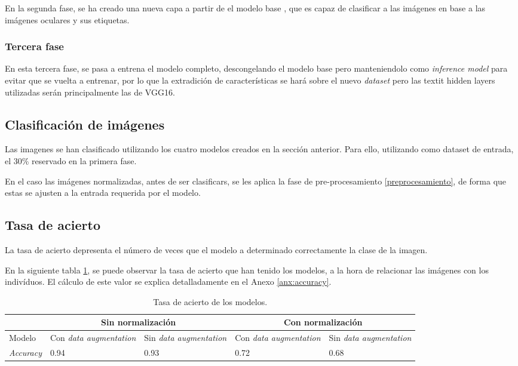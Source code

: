 En la segunda fase, se ha creado una nueva capa a partir de el modelo base , que es capaz de clasificar a las imágenes en base a las imágenes oculares y sus etiquetas. 

\subsubsection{Tercera fase}

En esta tercera fase, se pasa a entrena el modelo completo, descongelando el modelo base pero manteniendolo como \textit{inference model} para evitar que se vuelta a entrenar,  por lo que la extradición de características se hará sobre el nuevo \textit{dataset} pero las textit {hidden layers} utilizadas serán principalmente las de VGG16.

\subsection{Clasificación de imágenes}

Las imagenes se han clasificado utilizando los cuatro modelos creados en la sección anterior. Para ello, utilizando como dataset de entrada, el 30\% reservado en la primera fase.

En el caso las imágenes normalizadas, antes de ser clasificars, se les aplica la fase de pre-procesamiento \ref{preprocesamiento}, de forma que estas se ajusten a la entrada requerida por el modelo.

\subsection{Tasa de acierto} 

La tasa de acierto depresenta el número de veces que el modelo a determinado correctamente la clase de la imagen. 

En la siguiente tabla \ref{tabla:tasa-acierto-modelos}, se puede observar la tasa de acierto que han tenido los modelos, a la hora de relacionar las imágenes
 con los indivíduos. El cálculo de este valor se explica detalladamente en el Anexo \ref{anx:accuracy}.

\begin{table}[h!]
\begin{tabular}{ |p{2cm}||p{2cm}|p{2cm}|p{2cm}|p{2cm}|  }
    \hline
     & \multicolumn{2}{|c|}{Sin normalización} & \multicolumn{2}{|c|}{Con normalización} \\
    \hline
    Modelo& Con \textit{data augmentation} & Sin \textit{data augmentation} &Con \textit{data augmentation}&Sin \textit{data augmentation}\\
    \hline
    \textit{Accuracy} & 0.94   & 0.93    & 0.72 &   0.68\\
    \hline
   \end{tabular}
   \caption{\label{tabla:tasa-acierto-modelos}Tasa de acierto de los modelos.}
\end{table}


